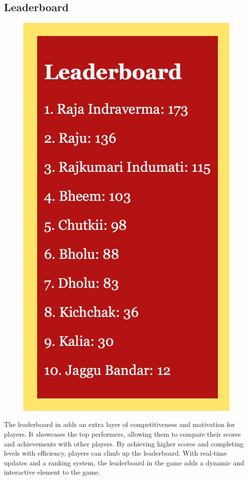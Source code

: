 \documentclass{article}
\begin{document}
\subsection{Leaderboard}
\begin{figure}
  \vspace{-1.5\baselineskip}
  \includegraphics[width=0.8\linewidth, valign=t]{leaderboard.png}
\end{figure}
The leaderboard in adds an extra layer of competitiveness and motivation for players. It showcases the top performers, allowing them to compare their scores and achievements with other players. By achieving higher scores and completing levels with efficiency, players can climb up the leaderboard. With real-time updates and a ranking system, the leaderboard in the game adds a dynamic and interactive element to the game.
\\
\\
\\
\\
\\
\\
\\
\\
\\
\\
\end{document}
